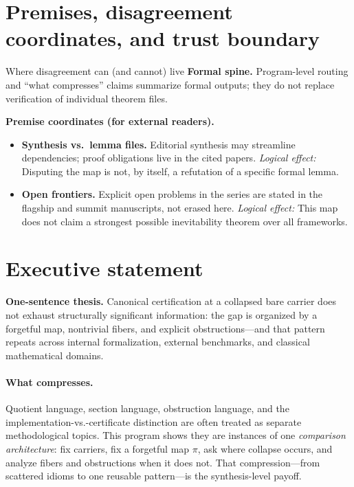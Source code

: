 \documentclass[11pt]{article}
\begin{document}
\section{Premises, disagreement coordinates, and trust boundary}\label{sec:premises-ic-synthesis}
\begin{keybox}{Where disagreement can (and cannot) live}
\textbf{Formal spine.}
Program-level routing and ``what compresses'' claims summarize formal outputs; they do not replace verification of individual theorem files.

\medskip
\textbf{Premise coordinates (for external readers).}
{\raggedright
\begin{itemize}[leftmargin=2em]
\item \textbf{Synthesis vs.\ lemma files.} Editorial synthesis may streamline dependencies; proof obligations live in the cited papers.
  \emph{Logical effect:} Disputing the map is not, by itself, a refutation of a specific formal lemma.
\item \textbf{Open frontiers.} Explicit open problems in the series are stated in the flagship and summit manuscripts, not erased here.
  \emph{Logical effect:} This map does not claim a strongest possible inevitability theorem over all frameworks.
\end{itemize}
\par}
\end{keybox}

\tableofcontents
\newpage

\section{Executive statement}

\textbf{One-sentence thesis.} Canonical certification at a collapsed bare carrier does not
exhaust structurally significant information: the gap is organized by a forgetful map,
nontrivial fibers, and explicit obstructions---and that pattern repeats across internal
formalization, external benchmarks, and classical mathematical domains.

\paragraph{What compresses.}
Quotient language, section language, obstruction language, and the implementation-vs.-certificate
distinction are often treated as separate methodological topics. This program shows they are
instances of one \emph{comparison architecture}: fix carriers, fix a forgetful map $\pi$,
ask where collapse occurs, and analyze fibers and obstructions when it does not. That
compression---from scattered idioms to one reusable pattern---is the synthesis-level
payoff.
\end{document}
